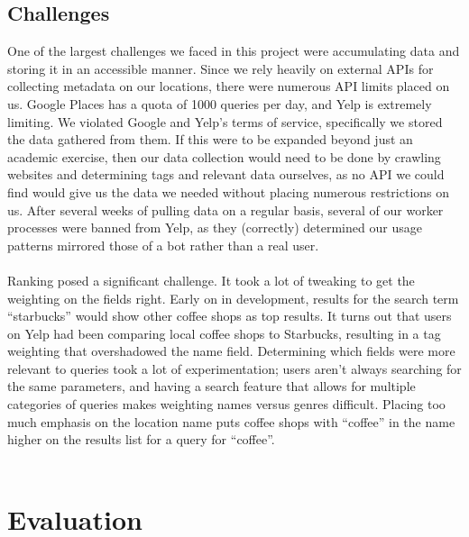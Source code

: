 \documentclass{article}
\begin{document}
\subsection{Challenges}
One of the largest challenges we faced in this project were accumulating data and storing it in an accessible manner. Since we rely heavily on external APIs for collecting metadata on our locations, there were numerous API limits placed on us. Google Places has a quota of 1000 queries per day, and Yelp is extremely limiting. We violated Google and Yelp's terms of service, specifically we stored the data gathered from them. If this were to be expanded beyond just an academic exercise, then our data collection would need to be done by crawling websites and determining tags and relevant data ourselves, as no API we could find would give us the data we needed without placing numerous restrictions on us. After several weeks of pulling data on a regular basis, several of our worker processes were banned from Yelp, as they (correctly) determined our usage patterns mirrored those of a bot rather than a real user.
\\ \\
Ranking posed a significant challenge. It took a lot of tweaking to get the weighting on the fields right. Early on in development, results for the search term ``starbucks'' would show other coffee shops as top results. It turns out that users on Yelp had been comparing local coffee shops to Starbucks, resulting in a tag weighting that overshadowed the name field. Determining which fields were more relevant to queries took a lot of experimentation; users aren't always searching for the same parameters, and having a search feature that allows for multiple categories of queries makes weighting names versus genres difficult. Placing too much emphasis on the location name puts coffee shops with ``coffee'' in the name higher on the results list for a query for ``coffee''.
\\ \\

\section{Evaluation}
\end{document}
